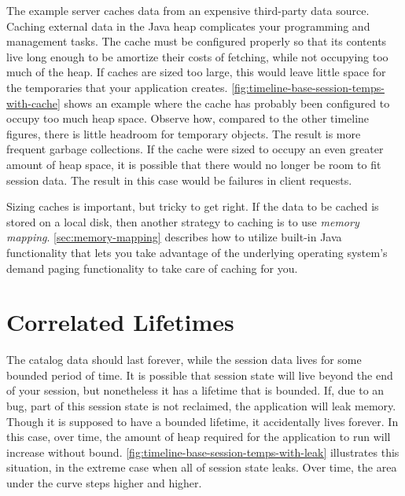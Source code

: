 The example server caches data from an expensive third-party data source. Caching
external data in the Java heap complicates your programming and management tasks.
The cache must be configured properly so that its contents live long enough to be
amortize their costs of fetching, while not occupying too much of the heap. If
caches are sized too large, this would leave little space for the temporaries
that your application creates.
\autoref{fig:timeline-base-session-temps-with-cache} shows an example where the
cache has probably been configured to occupy too much heap space. Observe how,
compared to the other timeline figures, there is little headroom for temporary
objects. The result is more frequent garbage collections. If the cache were sized
to occupy an even greater amount of heap space, it is possible that there would
no longer be room to fit session data. The result in this case would be failures
in client requests.

Sizing caches is important, but tricky to get right. If the data to be cached is
stored on a local disk, then another strategy to caching is to use \emph{memory
mapping}. \autoref{sec:memory-mapping} describes how to utilize built-in Java
functionality that lets you take advantage of the underlying operating system's
demand paging functionality to take care of caching for you.

\section{Correlated Lifetimes}
\label{sec:correlated-lifetime-pattern}

The catalog data should last forever, while the
session data lives for some bounded period of time. It is possible that session
state will live beyond the end of your session, but nonetheless it has a
lifetime that is bounded. If, due to an bug, part of this session state is not
reclaimed, the application will leak memory. Though it is supposed to have a bounded lifetime, it
accidentally lives forever. In this
case, over time, the amount of heap required for the application to run will increase without bound.
\autoref{fig:timeline-base-session-temps-with-leak} illustrates this situation,
in the extreme case when all of session state leaks. Over time, the area under
the curve steps higher and higher.

